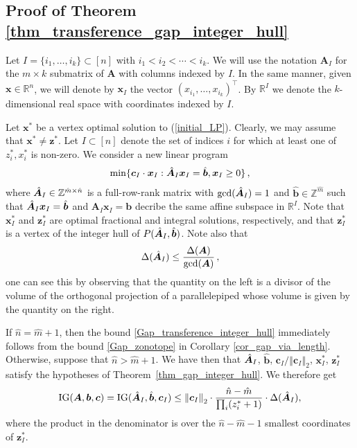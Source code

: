 \documentclass[runningheads]{llncs}
\newcommand{\ve}{\boldsymbol}
\newcommand{\be}{\begin{eqnarray}}
\newcommand{\ee}{\end{eqnarray}}
\newcommand{\R}{\mathbb R}
\newcommand{\Z}{\mathbb Z}
\newcommand{\KP}{{P}}
\renewcommand\>{\rangle}
\newcommand\<{\langle}
\newcommand\0{\mathbf{0}}
\newcommand\bb{\ve b}%
\newcommand\cc{\ve c}%
\newcommand\xx{\ve x}%
\newcommand\zz{\ve z}%
\renewcommand\AA{\ve A}%
\newcommand\IG{\mathrm{IG}}%
\newcommand{\norm}[1]{\left\Vert #1\right\Vert }%
\newcommand\AAhat{\hat{\AA\;}\negthickspace}%
\begin{document}
\subsection{Proof of Theorem \ref{thm_transference_gap_integer_hull} }

 Let $I=\{i_1,\ldots, i_k\} \subset  [n]$ with $i_1<i_2<\cdots<i_k$. We will use the notation  $\AA_I$ for the $m \times k$ submatrix  of $\AA$ with columns indexed by $I$.  In the same manner, given ${\ve x}\in \R^n$, we will denote by ${\ve x}_I$ the vector $(x_{i_1}, \ldots, x_{i_k})^{\top}$. By $\R^I$ we denote the $k$-dimensional real space with coordinates indexed by $I$. %

Let $\xx^{*}$ be a vertex optimal solution to (\ref{initial_LP}). Clearly, we may assume that $\xx^{*}\neq \zz^{*}$.
Let $I\subset[n]$ denote the set of indices $i$ for which at least one of $z_i^*,x_i^*$ is non-zero. We consider a new linear program
\be\label{new_linear_prog}
\min\{\cc_I\cdot\xx_I:\AAhat_I\xx_I=\hat{\bb},\xx_I\geq 0\}\,,
\ee
where ${\AAhat}_I\in\Z^{\hat{m}\times\hat{n}}$ is a full-row-rank matrix with $\gcd({\AAhat}_I)=1$ and $\hat{\bb}\in\Z^{\hat{m}}$ such that ${\AAhat}_I\xx_I=\hat{\bb}$ and $\AA_I\xx_I=\bb$ decribe the same affine subspace in $\R^I$. Note that $\xx_I^*$ and $\zz_I^*$ are optimal fractional and integral solutions, respectively, and that $\zz_I^*$ is a vertex of the integer hull of $\KP({\AAhat}_I,\hat{\bb})$. Note also that
\be\label{new_delta_lower_bound}
\Delta({\AAhat}_I)\leq\frac{\Delta(\AA)}{\gcd(\AA)}\,,
\ee
one can see this by observing that the quantity on the left is a divisor of the volume of the orthogonal projection of a parallelepiped whose volume is given by the quantity on the right. 

If $\hat{n}=\hat{m}+1$, then the bound \eqref{Gap_transference_integer_hull} immediately follows from the bound 
\eqref{Gap_zonotope} in Corollary \ref{cor_gap_via_length}. Otherwise, suppose that $\hat{n}>\hat{m}+1$. We have then that ${\AAhat}_I$, $\hat{\bb}$, $\cc_I/\norm{\cc_I}_2$, $\xx_I^*$, $\zz_I^*$ satisfy the hypotheses of Theorem~\ref{thm_gap_integer_hull}. We therefore get
\be\label{new_IG_bound}
\IG(\AA,\bb,\cc)=\IG(\AAhat_I,\hat{\bb},\cc_I)\leq\norm{\cc_I}_2\cdot\frac{\hat{n}-\hat{m}}{\prod_i (z_i^*+1)}\cdot\Delta(\AAhat_I),
\ee
where the product in the denominator is over the $\hat{n}-\hat{m}-1$ smallest coordinates of $\zz_I^*$.
\end{document}
